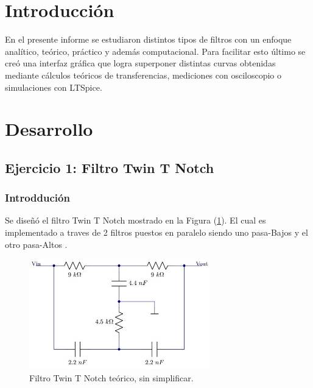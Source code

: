 \documentclass[a4paper]{article}
\begin{document}




\section{Introducción}

En el presente informe se estudiaron distintos tipos de filtros con un enfoque analítico, teórico, práctico y además computacional. Para facilitar esto último se creó una interfaz gráfica que logra superponer distintas curvas obtenidas mediante cálculos teóricos de transferencias, mediciones con osciloscopio o simulaciones con LTSpice.

\section{Desarrollo}

\subsection{Ejercicio 1: Filtro Twin T Notch}
\subsubsection{Introddución}
Se diseñó el filtro Twin T Notch mostrado en la Figura (\ref{fig:filtroinicial}). El cual es implementado a traves de 2 filtros puestos en paralelo siendo uno pasa-Bajos y el otro pasa-Altos .

\begin{figure}[H]
	\centering
	\includegraphics[width=0.7\textwidth ,trim={0 0.1cm  0.5cm 0},clip]{ej1inicial.jpg}
\caption{Filtro Twin T Notch teórico, sin simplificar.}
	\label{fig:filtroinicial}
\end{figure}
\end{document}
